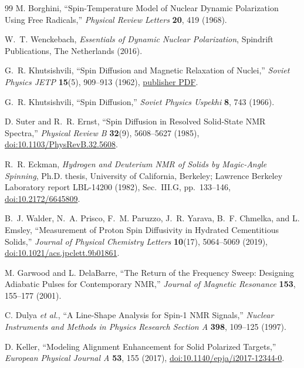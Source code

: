 \documentclass[11pt]{article}
\begin{document}
\begin{thebibliography}{99}
M. Borghini,
``Spin-Temperature Model of Nuclear Dynamic Polarization Using Free Radicals,''
\emph{Physical Review Letters} \textbf{20}, 419 (1968).

W.~T. Wenckebach,
\emph{Essentials of Dynamic Nuclear Polarization},
Spindrift Publications, The Netherlands (2016).

G.~R. Khutsishvili,
``Spin Diffusion and Magnetic Relaxation of Nuclei,''
\emph{Soviet Physics JETP} \textbf{15}(5), 909--913 (1962),
\href{https://jetp.ras.ru/cgi-bin/dn/e_015_05_0909.pdf}{publisher PDF}.

G.~R. Khutsishvili,
``Spin Diffusion,''
\emph{Soviet Physics Uspekhi} \textbf{8}, 743 (1966).

D. Suter and R.~R. Ernst,
``Spin Diffusion in Resolved Solid-State NMR Spectra,''
\emph{Physical Review B} \textbf{32}(9), 5608--5627 (1985),
\href{https://doi.org/10.1103/PhysRevB.32.5608}{doi:10.1103/PhysRevB.32.5608}.

R.~R. Eckman,
\emph{Hydrogen and Deuterium NMR of Solids by Magic-Angle Spinning},
Ph.D. thesis, University of California, Berkeley;
Lawrence Berkeley Laboratory report LBL-14200 (1982),
Sec.~III.G, pp.~133--146,
\href{https://doi.org/10.2172/6645809}{doi:10.2172/6645809}.

B.~J. Walder, N.~A. Prisco, F.~M. Paruzzo, J.~R. Yarava,
B.~F. Chmelka, and L. Emsley,
``Measurement of Proton Spin Diffusivity in Hydrated Cementitious Solids,''
\emph{Journal of Physical Chemistry Letters} \textbf{10}(17),
5064--5069 (2019),
\href{https://doi.org/10.1021/acs.jpclett.9b01861}{doi:10.1021/acs.jpclett.9b01861}.

M. Garwood and L. DelaBarre,
``The Return of the Frequency Sweep: Designing Adiabatic Pulses for Contemporary NMR,''
\emph{Journal of Magnetic Resonance} \textbf{153}, 155--177 (2001).

C. Dulya \emph{et al.},
``A Line-Shape Analysis for Spin-1 NMR Signals,''
\emph{Nuclear Instruments and Methods in Physics Research Section A} \textbf{398}, 109--125 (1997).

D. Keller,
``Modeling Alignment Enhancement for Solid Polarized Targets,''
\emph{European Physical Journal A} \textbf{53}, 155 (2017),
\href{https://doi.org/10.1140/epja/i2017-12344-0}{doi:10.1140/epja/i2017-12344-0}.


\end{thebibliography}
\end{document}
